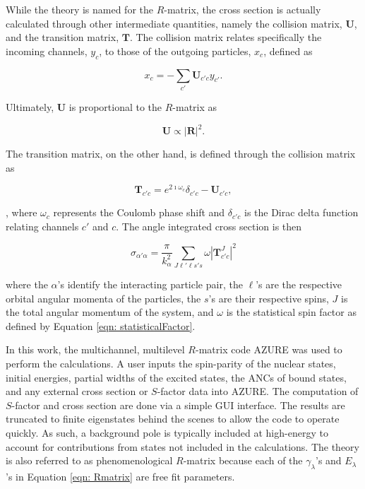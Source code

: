 While the theory is named for the $R$-matrix, the cross section is actually calculated through other intermediate quantities, namely the collision matrix, $\mathbf{U}$, and the transition matrix, $\mathbf{T}$. The collision matrix relates specifically the incoming channels, $y_{c}$, to those of the outgoing particles, $x_{c}$, defined as

\begin{equation}
x_{c} = - \sum_{c'} \mathbf{U}_{c' c} y_{c'}.
\end{equation}

\noindent Ultimately, $\mathbf{U}$ is proportional to the $R$-matrix as

\begin{equation}
\mathbf{U} \propto | \mathbf{R} |^{2}.
\end{equation}

\noindent The transition matrix, on the other hand, is defined through the collision matrix as 

\begin{equation}
\mathbf{T}_{c' c} = e^{2\imath \omega_{c}} \delta_{c' c} - \mathbf{U}_{c' c},
\end{equation}

\noindent, where $\omega_{c}$ represents the Coulomb phase shift and $\delta_{c' c}$ is the Dirac delta function relating channels $c'$ and $c$. The angle integrated cross section is then 

\begin{equation}
\sigma_{\alpha' \alpha} = \dfrac{\pi}{k_{\alpha}^{2}} \sum_{J \ell' \ell s' s} \omega | \mathbf{T}_{c' c}^{J} |^{2}
\end{equation}

\noindent where the $\alpha$'s identify the interacting particle pair, the $\ell$'s are the respective orbital angular momenta of the particles, the $s$'s are their respective spins, $J$ is the total angular momentum of the system, and $\omega$ is the statistical spin factor as defined by Equation \ref{eqn: statisticalFactor}. 

In this work, the multichannel, multilevel $R$-matrix code AZURE \cite{Azuma2010} was used to perform the calculations. A user inputs the spin-parity of the nuclear states, initial energies, partial widths of the excited states, the ANCs of bound states, and any external cross section or $S$-factor data into AZURE. The computation of $S$-factor and cross section are done via a simple GUI interface. The results are truncated to finite eigenstates behind the scenes to allow the code to operate quickly. As such, a background pole is typically included at high-energy to account for contributions from states not included in the calculations. The theory is also referred to as phenomenological $R$-matrix because each of the $\gamma_{\lambda}$'s and $E_{\lambda}$'s in Equation \ref{eqn: Rmatrix} are free fit parameters. 





